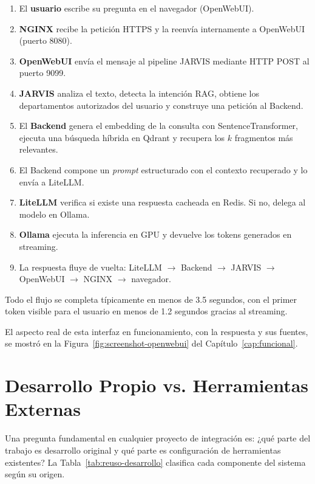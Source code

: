 \begin{enumerate}
    \item El \textbf{usuario} escribe su pregunta en el navegador (OpenWebUI).
    \item \textbf{NGINX} recibe la petición HTTPS y la reenvía internamente a OpenWebUI (puerto 8080).
    \item \textbf{OpenWebUI} envía el mensaje al pipeline JARVIS mediante HTTP POST al puerto 9099.
    \item \textbf{JARVIS} analiza el texto, detecta la intención RAG, obtiene los departamentos autorizados del usuario y construye una petición al Backend.
    \item El \textbf{Backend} genera el embedding de la consulta con SentenceTransformer, ejecuta una búsqueda híbrida en Qdrant y recupera los $k$ fragmentos más relevantes.
    \item El Backend compone un \textit{prompt} estructurado con el contexto recuperado y lo envía a LiteLLM.
    \item \textbf{LiteLLM} verifica si existe una respuesta cacheada en Redis. Si no, delega al modelo en Ollama.
    \item \textbf{Ollama} ejecuta la inferencia en GPU y devuelve los tokens generados en streaming.
    \item La respuesta fluye de vuelta: LiteLLM $\rightarrow$ Backend $\rightarrow$ JARVIS $\rightarrow$ OpenWebUI $\rightarrow$ NGINX $\rightarrow$ navegador.
\end{enumerate}

Todo el flujo se completa típicamente en menos de 3.5 segundos, con el primer token visible para el usuario en menos de 1.2 segundos gracias al streaming.

El aspecto real de esta interfaz en funcionamiento, con la respuesta y sus fuentes, se mostró en la Figura~\ref{fig:screenshot-openwebui} del Capítulo~\ref{cap:funcional}.

\section{Desarrollo Propio vs. Herramientas Externas}
\label{sec:propio-vs-externo}

Una pregunta fundamental en cualquier proyecto de integración es: ¿qué parte del trabajo es desarrollo original y qué parte es configuración de herramientas existentes? La Tabla~\ref{tab:reuso-desarrollo} clasifica cada componente del sistema según su origen.

